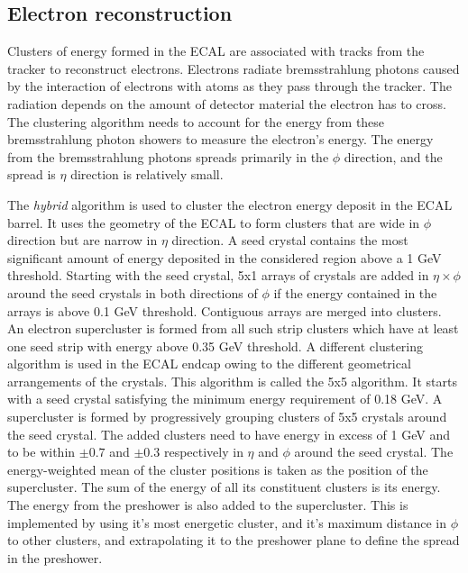 \subsection{Electron reconstruction}
\label{e_recon}

Clusters of energy formed in the ECAL are associated with tracks from the tracker to reconstruct electrons. Electrons radiate bremsstrahlung photons caused by the interaction of electrons with atoms as they pass through the tracker. The radiation depends on the amount of detector material the electron has to cross. The clustering algorithm needs to account for the energy from these bremsstrahlung photon showers to measure the electron's energy. The energy from the bremsstrahlung photons spreads primarily in the $\phi$ direction, and the spread is $\eta$ direction is relatively small.

The \textit{hybrid} algorithm is used to cluster the electron energy deposit in the ECAL barrel. It uses the geometry of the ECAL to form clusters that are wide in $\phi$ direction but are narrow in $\eta$ direction. A seed crystal contains the most significant amount of energy deposited in the considered region above a 1 GeV threshold. Starting with the seed crystal, 5x1 arrays of crystals are added in $\eta\times\phi$ around the seed crystals in both directions of $\phi$ if the energy contained in the arrays is above 0.1 GeV threshold. Contiguous arrays are merged into clusters. An electron supercluster is formed from all such strip clusters which have at least one seed strip with energy above 0.35 GeV threshold. A different clustering algorithm is used in the ECAL endcap owing to the different geometrical arrangements of the crystals. This algorithm is called the 5x5 algorithm. It starts with a seed crystal satisfying the minimum energy requirement of 0.18 GeV. A supercluster is formed by progressively grouping clusters of 5x5 crystals around the seed crystal. The added clusters need to have energy in excess of 1 GeV and to be within $\pm 0.7$  and $\pm 0.3$ respectively in $\eta$ and $\phi$ around the seed crystal. The energy-weighted mean of the cluster positions is taken as the position of the supercluster. The sum of the energy of all its constituent clusters is its energy. The energy from the preshower is also added to the supercluster. This is implemented by using it's most energetic cluster, and it's maximum distance in $\phi$ to other clusters, and extrapolating it to the preshower plane to define the spread in the preshower.

